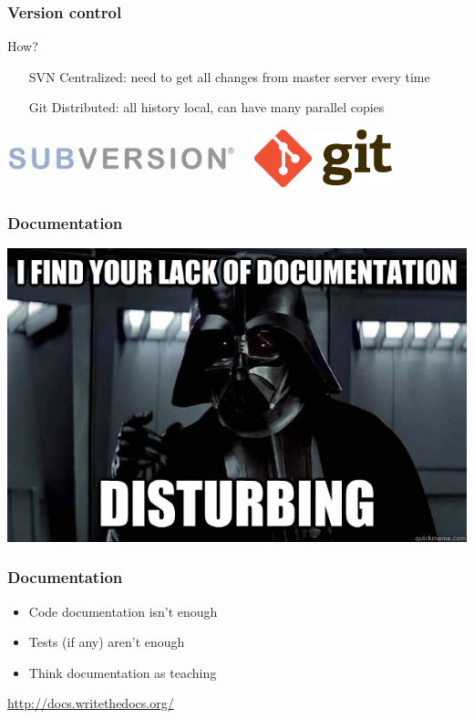 \documentclass[14pt,notes]{beamer}
\begin{document}
\begin{frame}
\frametitle{Version control}
\begin{block}{How?}
\begin{itemize}
\item[SVN] Centralized: need to get all changes from master server every time
\item[\alert{Git}] Distributed: all history local, can have many parallel copies
\end{itemize}
\includegraphics[width=0.5\textwidth]{svn-name-banner.jpg}$\quad$
\includegraphics[width=0.3\textwidth]{Git-Logo-2Color.png}
\end{block}
\end{frame}


\begin{frame}
\frametitle{Documentation}
\centering
\includegraphics[width=\textwidth]{docu}

\end{frame}



\begin{frame}
\frametitle{Documentation}
\begin{itemize}
\item Code documentation isn't enough
\item Tests (if any) aren't enough
\item Think documentation as teaching
\end{itemize}
\url{http://docs.writethedocs.org/}
\end{frame}
\end{document}
